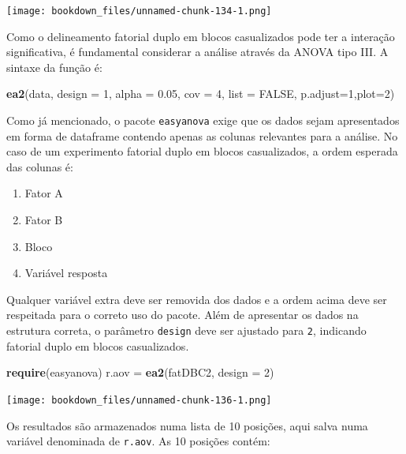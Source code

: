 \documentclass[
]{article}
\newenvironment{Shaded}{\begin{snugshade}}{\end{snugshade}}
\newcommand{\DataTypeTok}[1]{\textcolor[rgb]{0.13,0.29,0.53}{#1}}
\newcommand{\DecValTok}[1]{\textcolor[rgb]{0.00,0.00,0.81}{#1}}
\newcommand{\FloatTok}[1]{\textcolor[rgb]{0.00,0.00,0.81}{#1}}
\newcommand{\KeywordTok}[1]{\textcolor[rgb]{0.13,0.29,0.53}{\textbf{#1}}}
\newcommand{\NormalTok}[1]{#1}
\newcommand{\OtherTok}[1]{\textcolor[rgb]{0.56,0.35,0.01}{#1}}
\newcommand{\StringTok}[1]{\textcolor[rgb]{0.31,0.60,0.02}{#1}}
\providecommand{\tightlist}{%
  \setlength{\itemsep}{0pt}\setlength{\parskip}{0pt}}
\begin{document}
\texttt{[image: bookdown\_files/unnamed-chunk-134-1.png]}

Como o delineamento fatorial duplo em blocos casualizados pode ter a interação significativa, é fundamental considerar a análise através da ANOVA tipo III. A sintaxe da função é:

\begin{Shaded}
\begin{Highlighting}[]
\KeywordTok{ea2}\NormalTok{(data, }\DataTypeTok{design =} \DecValTok{1}\NormalTok{, }\DataTypeTok{alpha =} \FloatTok{0.05}\NormalTok{, }\DataTypeTok{cov =} \DecValTok{4}\NormalTok{, }\DataTypeTok{list =} \OtherTok{FALSE}\NormalTok{, }
    \DataTypeTok{p.adjust=}\DecValTok{1}\NormalTok{,}\DataTypeTok{plot=}\DecValTok{2}\NormalTok{)}
\end{Highlighting}
\end{Shaded}

Como já mencionado, o pacote \texttt{easyanova} exige que os dados sejam apresentados em forma de dataframe contendo apenas as colunas relevantes para a análise. No caso de um experimento fatorial duplo em blocos casualizados, a ordem esperada das colunas é:

\begin{enumerate}
\def\labelenumi{\arabic{enumi}.}
\tightlist
\item
  Fator A
\item
  Fator B
\item
  Bloco
\item
  Variável resposta
\end{enumerate}

Qualquer variável extra deve ser removida dos dados e a ordem acima deve ser respeitada para o correto uso do pacote. Além de apresentar os dados na estrutura correta, o parâmetro \texttt{design} deve ser ajustado para \texttt{2}, indicando fatorial duplo em blocos casualizados.

\begin{Shaded}
\begin{Highlighting}[]
\KeywordTok{require}\NormalTok{(easyanova)}
\NormalTok{r.aov =}\StringTok{ }\KeywordTok{ea2}\NormalTok{(fatDBC2, }\DataTypeTok{design =} \DecValTok{2}\NormalTok{)}
\end{Highlighting}
\end{Shaded}

\texttt{[image: bookdown\_files/unnamed-chunk-136-1.png]}

Os resultados são armazenados numa lista de 10 posições, aqui salva numa variável denominada de \texttt{r.aov}. As 10 posições contém:
\end{document}
